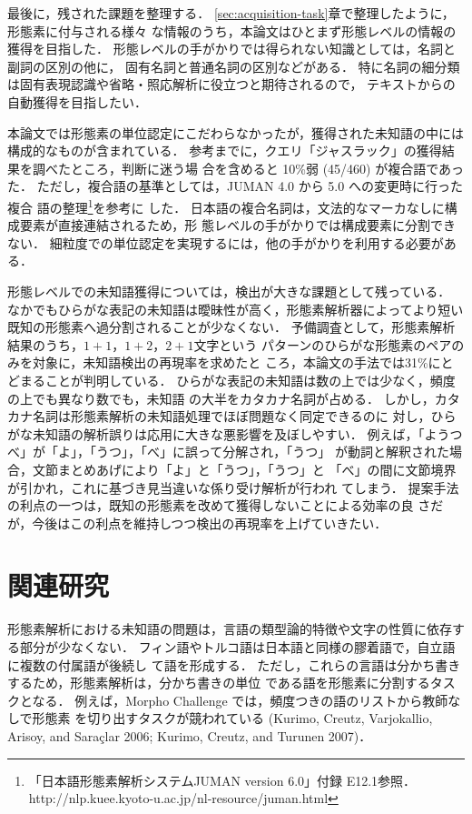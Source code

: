 \documentclass[japanese]{jnlp_1.4}
\begin{document}
最後に，残された課題を整理する．
\ref{sec:acquisition-task}章で整理したように，形態素に付与される様々
な情報のうち，本論文はひとまず形態レベルの情報の獲得を目指した．
形態レベルの手がかりでは得られない知識としては，名詞と副詞の区別の他に，
固有名詞と普通名詞の区別などがある．
特に名詞の細分類は固有表現認識や省略・照応解析に役立つと期待されるので，
テキストからの自動獲得を目指したい．

本論文では形態素の単位認定にこだわらなかったが，獲得された未知語の中には
構成的なものが含まれている．
参考までに，クエリ「ジャスラック」の獲得結果を調べたところ，判断に迷う場
合を含めると 10\%弱 (45/460) が複合語であった．
ただし，複合語の基準としては，JUMAN 4.0 から 5.0 への変更時に行った複合
語の整理\footnote{「日本語形態素解析システムJUMAN version 6.0」付録
E12.1参照．
    http://nlp.kuee.kyoto-u.ac.jp/nl-resource/juman.html}を参考に
した．
日本語の複合名詞は，文法的なマーカなしに構成要素が直接連結されるため，形
態レベルの手がかりでは構成要素に分割できない．
細粒度での単位認定を実現するには，他の手がかりを利用する必要がある．


形態レベルでの未知語獲得については，検出が大きな課題として残っている．
なかでもひらがな表記の未知語は曖昧性が高く，形態素解析器によってより短い
既知の形態素へ過分割されることが少なくない．
予備調査として，形態素解析結果のうち，$1+1$，$1+2$，$2+1$文字という
パターンのひらがな形態素のペアのみを対象に，未知語検出の再現率を求めたと
ころ，本論文の手法では31\%にとどまることが判明している．
ひらがな表記の未知語は数の上では少なく，頻度の上でも異なり数でも，未知語
の大半をカタカナ名詞が占める．
しかし，カタカナ名詞は形態素解析の未知語処理でほぼ問題なく同定できるのに
対し，ひらがな未知語の解析誤りは応用に大きな悪影響を及ぼしやすい．
例えば，「ようつべ」が「よ」，「うつ」，「べ」に誤って分解され，「うつ」
が動詞と解釈された場合，文節まとめあげにより「よ」と「うつ」，「うつ」と
「べ」の間に文節境界が引かれ，これに基づき見当違いな係り受け解析が行われ
てしまう．
提案手法の利点の一つは，既知の形態素を改めて獲得しないことによる効率の良
さだが，今後はこの利点を維持しつつ検出の再現率を上げていきたい．




\section{関連研究} \label{sec:related-work}

形態素解析における未知語の問題は，言語の類型論的特徴や文字の性質に依存す
る部分が少なくない．
フィン語やトルコ語は日本語と同様の膠着語で，自立語に複数の付属語が後続し
て語を形成する．
ただし，これらの言語は分かち書きするため，形態素解析は，分かち書きの単位
である語を形態素に分割するタスクとなる．
例えば，Morpho Challenge では，頻度つきの語のリストから教師なしで形態素
    を切り出すタスクが競われている (Kurimo, Creutz, Varjokallio, Arisoy, and Sara{\c{c}}lar 2006; Kurimo, Creutz, and Turunen 2007)．
\end{document}
